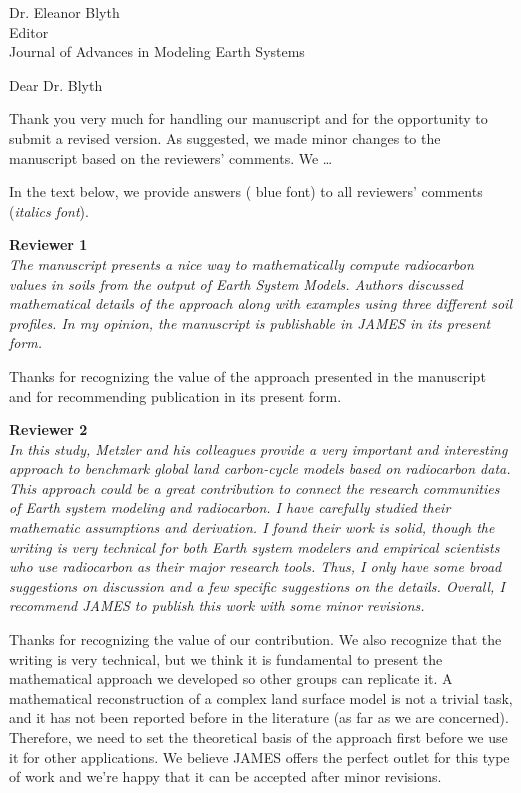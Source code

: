 \documentclass[11pt]{bgcletter}
\begin{document}
\begin{letter}{Dr. Eleanor Blyth\\
 Editor \\ Journal of Advances in Modeling Earth Systems}

\opening{Dear Dr. Blyth}
Thank you very much for handling our manuscript and for the opportunity to submit a revised version. As suggested, we made minor changes to the manuscript based on the reviewers' comments. We \dots

 In the text below, we provide answers ({\color{blue} blue font}) to all reviewers' comments ({\it italics font}). 

{\bf Reviewer 1} \\
{\it The manuscript presents a nice way to mathematically compute radiocarbon values in soils from the output of Earth System Models. Authors discussed mathematical details of the approach along with examples using three different soil profiles. In my opinion, the manuscript is publishable in JAMES in its present form. }

{\color{blue} Thanks for recognizing the value of the approach presented in the manuscript and for recommending publication in its present form.}

{\bf Reviewer 2} \\
{\it In this study, Metzler and his colleagues provide a very important and interesting approach to benchmark global land carbon-cycle models based on radiocarbon data. This approach could be a great contribution to connect the research communities of Earth system modeling and radiocarbon. I have carefully studied their mathematic assumptions and derivation. I found their work is solid, though the writing is very technical for both Earth system modelers and empirical scientists who use radiocarbon as their major research tools. Thus, I only have some broad suggestions on discussion and a few specific suggestions on the details. Overall, I recommend JAMES to publish this work with some minor revisions. }

{\color{blue} Thanks for recognizing the value of our contribution. We also recognize that the writing is very technical, but we think it is fundamental to present the mathematical approach we developed so other groups can replicate it. A mathematical reconstruction of a complex land surface model is not a trivial task, and it has not been  reported before in the literature (as far as we are concerned). Therefore, we need to set the theoretical basis of the approach first before we use it for other applications. We believe JAMES offers the perfect outlet for this type of work and we're happy that it can be accepted after minor revisions. }


\end{letter}
\end{document}
